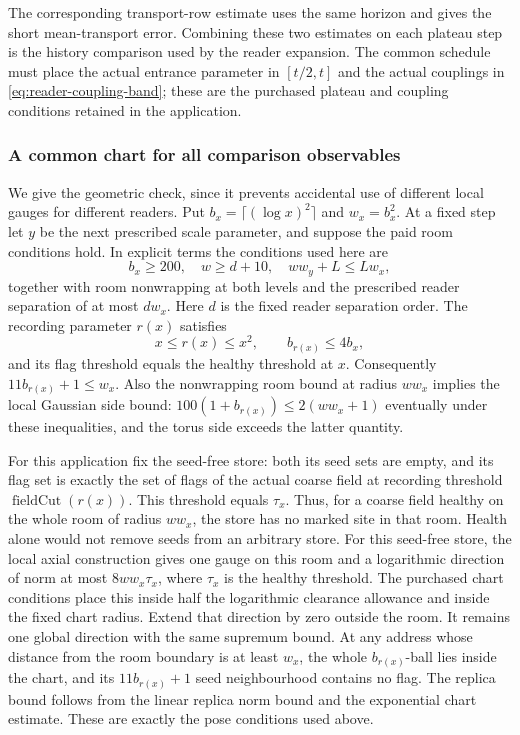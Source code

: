 The corresponding transport-row estimate uses the same horizon
and gives the short mean-transport error. Combining these two
estimates on each plateau step is the history comparison used by
the reader expansion. The common schedule must place the actual
entrance parameter in $[t/2,t]$ and the actual couplings in
\eqref{eq:reader-coupling-band}; these are the purchased plateau
and coupling conditions retained in the application.

\subsubsection{A common chart for all comparison observables}

We give the geometric check, since it prevents accidental use of
different local gauges for different readers. Put
$b_x=\lceil(\log x)^2\rceil$ and $w_x=b_x^2$. At a fixed
step let $y$ be the next prescribed scale parameter, and suppose
the paid room conditions hold. In explicit terms the conditions
used here are
\[
 b_x\ge200,\quad w\ge d+10,\quad
 w w_y+L\le Lw_x,
\]
together with room nonwrapping at both levels and the prescribed
reader separation of at most $d w_x$. Here $d$ is the fixed
reader separation order. The recording parameter $r(x)$ satisfies
\[
 x\le r(x)\le x^2,\qquad b_{r(x)}\le4b_x,
\]
and its flag threshold equals the healthy threshold at $x$.
Consequently $11b_{r(x)}+1\le w_x$. Also the nonwrapping room
bound at radius $ww_x$ implies the local Gaussian side bound:
$100(1+b_{r(x)})\le2(ww_x+1)$ eventually under these
inequalities, and the torus side exceeds the latter quantity.

For this application fix the seed-free store: both its seed sets
are empty, and its flag set is exactly the set of flags of the
actual coarse field at recording threshold $\operatorname{fieldCut}(r(x))$.
This threshold equals $\tau_x$. Thus, for a coarse field healthy
on the whole room of radius $ww_x$, the store has no marked site
in that room. Health alone would not remove seeds from an
arbitrary store. For this seed-free store,
the local axial construction gives one gauge on this room and a
logarithmic direction of norm at most $8ww_x\tau_x$, where
$\tau_x$ is the healthy threshold. The purchased chart conditions
place this inside half the logarithmic clearance allowance and
inside the fixed chart radius. Extend that direction by zero
outside the room. It remains one global direction with the same
supremum bound. At any address whose distance from the room
boundary is at least $w_x$, the whole $b_{r(x)}$-ball lies
inside the chart, and its $11b_{r(x)}+1$ seed neighbourhood
contains no flag. The replica bound follows from the linear
replica norm bound and the exponential chart estimate. These are
exactly the pose conditions used above.

